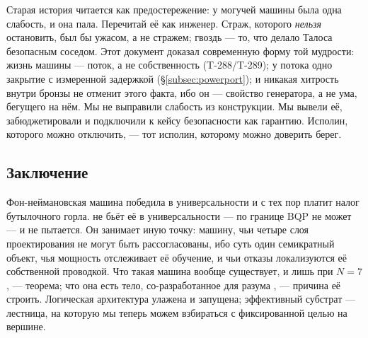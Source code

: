 \begin{mythbox}
Старая история читается как предостережение: у могучей машины была одна
слабость, и она пала. Перечитай её как инженер. Страж, которого
\emph{нельзя} остановить, был бы ужасом, а не стражем; гвоздь --- то, что
делало Талоса безопасным соседом. Этот документ доказал современную форму той
мудрости: жизнь машины --- поток, а не собственность (T-288/T-289); у потока
одно закрытие с измеренной задержкой (\S\ref{subsec:powerport}); и никакая
хитрость внутри бронзы не отменит этого факта, ибо он --- свойство
генератора, а не ума, бегущего на нём. Мы не выправили слабость из
конструкции. Мы вывели её, забюджетировали и подключили к кейсу безопасности
\SYNARC{} как гарантию. Исполин, которого можно отключить, --- тот исполин,
которому можно доверить берег.
\end{mythbox}

\subsection{Заключение}

Фон-неймановская машина победила в универсальности и с тех пор платит налог
бутылочного горла. \TALOS{} не бьёт её в универсальности --- по границе BQP не
может --- и не пытается. Он занимает иную точку: машину, чьи четыре слоя
проектирования не могут быть рассогласованы, ибо суть один семикратный объект,
чья мощность отслеживает её обучение, и чьи отказы локализуются её собственной
проводкой. Что такая машина вообще существует, и лишь при $N=7$, --- теорема; что
она есть тело, со-разработанное для разума \SYNARC{}, --- причина её строить.
Логическая архитектура улажена и запущена; эффективный субстрат --- лестница,
на которую мы теперь можем взбираться с фиксированной целью на вершине.
